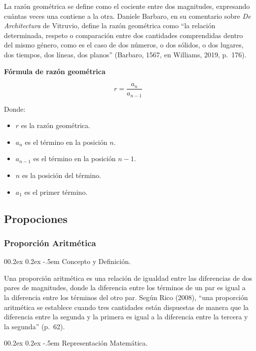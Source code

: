 \documentclass[
  stu,
  floatsintext,
  longtable,
  a4paper,
  nolmodern,
  notxfonts,
  notimes,
  colorlinks=true,linkcolor=blue,citecolor=blue,urlcolor=blue]{apa7}
\makeatletter
\renewcommand{\paragraph}{\@startsection{paragraph}{4}{\parindent}%
	{0\baselineskip \@plus 0.2ex \@minus 0.2ex}%
	{-.5em}%
	{\normalfont\normalsize\bfseries\typesectitle}}
\makeatother
\begin{document}
La razón geométrica se define como el cociente entre dos magnitudes,
expresando cuántas veces una contiene a la otra. Daniele Barbaro, en su
comentario sobre \emph{De Architectura} de Vitruvio, define la razón
geométrica como ``la relación determinada, respeto o comparación entre
dos cantidades comprendidas dentro del mismo género, como es el caso de
dos números, o dos sólidos, o dos lugares, dos tiempos, dos líneas, dos
planos'' (Barbaro, 1567, en Williams, 2019, p.~176).

\textbf{Fórmula de razón geométrica}

\[
r = \frac{a_{n}}{a_{n-1}}
\]

Donde:

\begin{itemize}
\item
  \(r\) es la razón geométrica.
\item
  \(a_{n}\) es el término en la posición \(n\).
\item
  \(a_{n-1}\) es el término en la posición \(n-1\).
\item
  \(n\) es la posición del término.
\item
  \(a_{1}\) es el primer término.
\end{itemize}

\subsection{Propociones}\label{propociones}

\subsubsection{Proporción Aritmética}\label{proporciuxf3n-aritmuxe9tica}

\paragraph{Concepto y Definición.}\label{concepto-y-definiciuxf3n}

Una proporción aritmética es una relación de igualdad entre las
diferencias de dos pares de magnitudes, donde la diferencia entre los
términos de un par es igual a la diferencia entre los términos del otro
par. Según Rico (2008), ``una proporción aritmética se establece cuando
tres cantidades están dispuestas de manera que la diferencia entre la
segunda y la primera es igual a la diferencia entre la tercera y la
segunda'' (p.~62).

\paragraph{Representación
Matemática.}\label{representaciuxf3n-matemuxe1tica}
\end{document}
